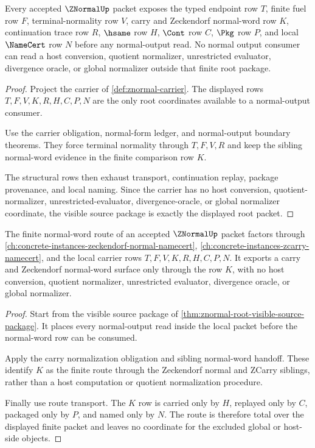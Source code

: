 \begin{theorem}
\label{thm:znormal-root-visible-source-package}
Every accepted $\ZNormalUp$ packet exposes the typed endpoint row $T$, finite
fuel row $F$, terminal-normality row $V$, carry and Zeckendorf normal-word row
$K$, continuation trace row $R$, $\hsame$ row $H$, $\Cont$ row $C$, $\Pkg$ row
$P$, and local $\NameCert$ row $N$ before any normal-output read. No normal
output consumer can read a host conversion, quotient normalizer, unrestricted
evaluator, divergence oracle, or global normalizer outside that finite root
package.
\end{theorem}
\begin{proof}
Project the carrier of \autoref{def:znormal-carrier}. The displayed rows
$T,F,V,K,R,H,C,P,N$ are the only root coordinates available to a normal-output
consumer.

Use the carrier obligation, normal-form ledger, and normal-output boundary
theorems. They force terminal normality through $T,F,V,R$ and keep the sibling
normal-word evidence in the finite comparison row $K$.

The structural rows then exhaust transport, continuation replay, package
provenance, and local naming. Since the carrier has no host conversion,
quotient-normalizer, unrestricted-evaluator, divergence-oracle, or global
normalizer coordinate, the visible source package is exactly the displayed root
packet.
\end{proof}

\begin{theorem}
\label{thm:znormal-root-normal-word-route-totality}
The finite normal-word route of an accepted $\ZNormalUp$ packet factors through
\autoref{ch:concrete-instances-zeckendorf-normal-namecert},
\autoref{ch:concrete-instances-zcarry-namecert}, and the local carrier rows
$T,F,V,K,R,H,C,P,N$. It exports a carry and Zeckendorf normal-word surface only
through the row $K$, with no host conversion, quotient normalizer, unrestricted
evaluator, divergence oracle, or global normalizer.
\end{theorem}
\begin{proof}
Start from the visible source package of
\autoref{thm:znormal-root-visible-source-package}. It places every
normal-output read inside the local packet before the normal-word row can be
consumed.

Apply the carry normalization obligation and sibling normal-word handoff. These
identify $K$ as the finite route through the Zeckendorf normal and ZCarry
siblings, rather than a host computation or quotient normalization procedure.

Finally use route transport. The $K$ row is carried only by $H$, replayed only
by $C$, packaged only by $P$, and named only by $N$. The route is therefore
total over the displayed finite packet and leaves no coordinate for the
excluded global or host-side objects.
\end{proof}

